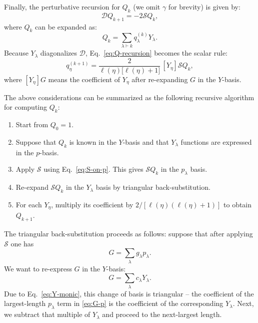 \documentclass[9pt,twocolumn,twoside]{gsajnl}
\newcommand{\Dop}{\mathcal D}
\newcommand{\Sop}{\mathcal S}
\begin{document}

Finally, the perturbative recursion for $Q_{k}$ (we omit $\gamma$ for brevity) is given by:
\begin{equation}
\Dop Q_{k+1}=-2 \Sop Q_k,
\label{eq:Q-recursion}
\end{equation}
where $Q_k$ can be expanded as:
\begin{equation}
Q_k=\sum_{\lambda\vdash k}q^{(k)}_\lambda Y_\lambda.
\label{eq:Q-Y-expansion}
\end{equation}
Because $Y_\lambda$ diagonalizes $\Dop$, Eq.~\eqref{eq:Q-recursion} becomes the scalar rule:
\begin{equation}
q^{(k+1)}_\eta
=
\frac{2}{\ell(\eta)\bigl[\ell(\eta)+1\bigr]}
\,[Y_\eta] \Sop Q_k,
\label{eq:q-recursion}
\end{equation}
where $[Y_\eta]G$ means the coefficient of $Y_\eta$ after re-expanding $G$ in the $Y$-basis.

The above considerations can be summarized as the following recursive algorithm for computing $Q_k$:
\begin{enumerate}
\item Start from $Q_0=1$.
\item Suppose that $Q_k$ is known in the $Y$-basis and that $Y_\lambda$ functions are expressed in the $p$-basis.
\item Apply $\Sop$ using Eq.~\eqref{eq:S-on-p}. This gives $\Sop Q_k$ in the $p_\lambda$ basis.
\item Re-expand $\Sop Q_k$ in the $Y_\lambda$ basis by triangular back-substitution.
\item For each $Y_\eta$, multiply its coefficient by $2/[\ell(\eta)(\ell(\eta)+1)]$ to obtain $Q_{k+1}$.
\end{enumerate}


The triangular back-substitution proceeds as follows: suppose that after applying $\Sop$ one has
\begin{equation}
G=\sum_\lambda g_\lambda p_\lambda.
\label{eq:G-p}
\end{equation}
We want to re-express $G$ in the $Y$-basis:
\begin{equation}
G=\sum_\lambda c_\lambda Y_\lambda.
\label{eq:G-Y}
\end{equation}
Due to Eq.~\eqref{eq:Y-monic}, this 
change of basis is triangular -- the coefficient of the largest-length $p_\lambda$ term in \eqref{eq:G-p} is the coefficient of the corresponding $Y_\lambda$.
Next, we subtract that multiple of $Y_\lambda$ and proceed to the next-largest length.
\end{document}
